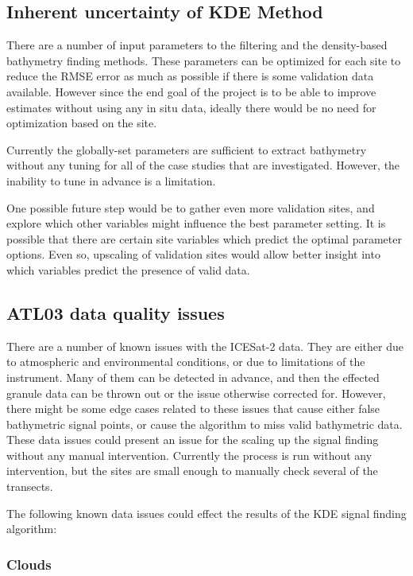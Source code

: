 \subsection{Inherent uncertainty of KDE Method}
There are a number of input parameters to the filtering and the density-based bathymetry finding methods. These parameters can be optimized for each site to reduce the RMSE error as much as possible if there is some validation data available. However since the end goal of the project is to be able to improve estimates without using any in situ data, ideally there would be no need for optimization based on the site.

Currently the globally-set parameters are sufficient to extract bathymetry without any tuning for all of the case studies that are investigated. However, the inability to tune in advance is a limitation. 

One possible future step would be to gather even more validation sites, and explore which other variables might influence the best parameter setting. It is possible that there are certain site variables which predict the optimal parameter options. Even so, upscaling of validation sites would allow better insight into which variables predict the presence of valid data.  

\subsection{ATL03 data quality issues}\label{sec:discussion-photon-issues}

There are a number of known issues with the ICESat-2 data. They are either due to atmospheric and environmental conditions, or due to limitations of the instrument. Many of them can be detected in advance, and then the effected granule data can be thrown out or the issue otherwise corrected for. However, there might be some edge cases related to these issues that cause either false bathymetric signal points, or cause the algorithm to miss valid bathymetric data. These data issues could present an issue for the scaling up the signal finding without any manual intervention. Currently the process is run without any intervention, but the sites are small enough to manually check several of the transects.

The following known data issues could effect the results of the KDE signal finding algorithm:

\subsubsection{Clouds}

